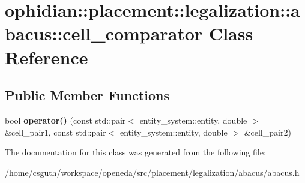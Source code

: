 \hypertarget{classophidian_1_1placement_1_1legalization_1_1abacus_1_1cell__comparator}{\section{ophidian\-:\-:placement\-:\-:legalization\-:\-:abacus\-:\-:cell\-\_\-comparator Class Reference}
\label{classophidian_1_1placement_1_1legalization_1_1abacus_1_1cell__comparator}
}
\subsection*{Public Member Functions}
\begin{DoxyCompactItemize}
\item 
\hypertarget{classophidian_1_1placement_1_1legalization_1_1abacus_1_1cell__comparator_a5de255ab5f88e544d84754112f9a331a}{bool {\bfseries operator()} (const std\-::pair$<$ entity\-\_\-system\-::entity, double $>$ \&cell\-\_\-pair1, const std\-::pair$<$ entity\-\_\-system\-::entity, double $>$ \&cell\-\_\-pair2)}\label{classophidian_1_1placement_1_1legalization_1_1abacus_1_1cell__comparator_a5de255ab5f88e544d84754112f9a331a}

\end{DoxyCompactItemize}


The documentation for this class was generated from the following file\-:\begin{DoxyCompactItemize}
\item 
/home/csguth/workspace/openeda/src/placement/legalization/abacus/abacus.\-h\end{DoxyCompactItemize}
